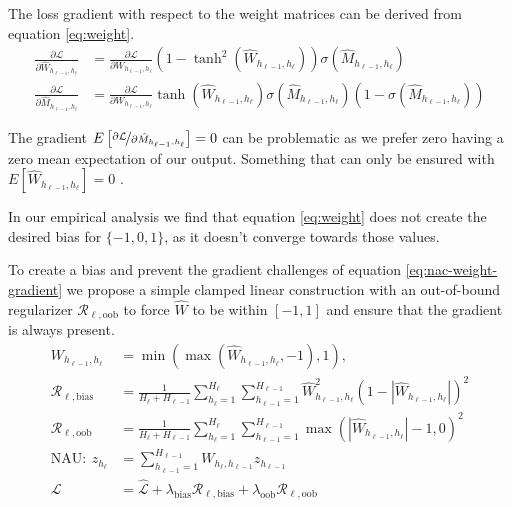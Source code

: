 The loss gradient with respect to the weight matrices can be derived from equation \ref{eq:weight}.
\begin{equation}
\begin{aligned}
\frac{\partial \mathcal{L}}{\partial \hat{W}_{h_{\ell-1},h_\ell}} &= \frac{\partial \mathcal{L}}{\partial W_{h_{\ell-1},h_\ell}} (1 - \tanh^2(\hat{W}_{h_{\ell-1},h_\ell})) \sigma(\hat{M}_{h_{\ell-1},h_\ell}) \\
\frac{\partial \mathcal{L}}{\partial \hat{M}_{h_{\ell-1},h_\ell}} &= \frac{\partial \mathcal{L}}{\partial W_{h_{\ell-1},h_\ell}} \tanh(\hat{W}_{h_{\ell-1},h_\ell}) \sigma(\hat{M}_{h_{\ell-1},h_\ell}) (1 - \sigma(\hat{M}_{h_{\ell-1},h_\ell}))
\end{aligned}
\label{eq:nac-weight-gradient}
\end{equation}

The gradient $E\left[\nicefrac{\partial \mathcal{L}}{\partial \hat{M}_{h_{\ell-1},h_\ell}}\right] = 0$ can be problematic as we prefer zero having a zero mean expectation of our output.
Something that can only be ensured with $E[\hat{W}_{h_{\ell-1},h_\ell}] = 0$ \cite{glorot-initialization}.

In our empirical analysis we find that equation \ref{eq:weight} does not create the desired bias for $\{-1, 0, 1\}$, as it doesn't converge towards those values.

To create a bias and prevent the gradient challenges of equation \ref{eq:nac-weight-gradient} we propose a simple clamped linear construction with an out-of-bound regularizer $\mathcal{R}_{\ell,\mathrm{oob}}$ to force $\hat{W}$ to be within $[-1, 1]$ and ensure that the gradient is always present.
\begin{equation}
\begin{aligned}
W_{h_{\ell-1},h_\ell} &= \min(\max(\hat{W}_{h_{\ell-1},h_\ell}, -1), 1), \\
\mathcal{R}_{\ell,\mathrm{bias}} &= \frac{1}{H_\ell + H_{\ell-1}} \sum_{h_\ell=1}^{H_\ell} \sum_{h_{\ell-1}=1}^{H_{\ell-1}} \hat{W}_{h_{\ell-1},h_\ell}^2 (1 - |\hat{W}_{h_{\ell-1},h_\ell}|)^2 \\
\mathcal{R}_{\ell,\mathrm{oob}} &= \frac{1}{H_\ell + H_{\ell-1}} \sum_{h_\ell=1}^{H_\ell} \sum_{h_{\ell-1}=1}^{H_{\ell-1}} \max(|\hat{W}_{h_{\ell-1},h_\ell}| - 1, 0)^2 \\
\textrm{NAU}:\ z_{h_\ell} &= \sum_{h_{\ell-1}=1}^{H_{\ell-1}} W_{h_{\ell}, h_{\ell-1}} z_{h_{\ell-1}} \\
\mathcal{L} &= \hat{\mathcal{L}} + \lambda_{\mathrm{bias}} \mathcal{R}_{\ell,\mathrm{bias}} + \lambda_{\mathrm{oob}} \mathcal{R}_{\ell,\mathrm{oob}}
\end{aligned}
\end{equation}

